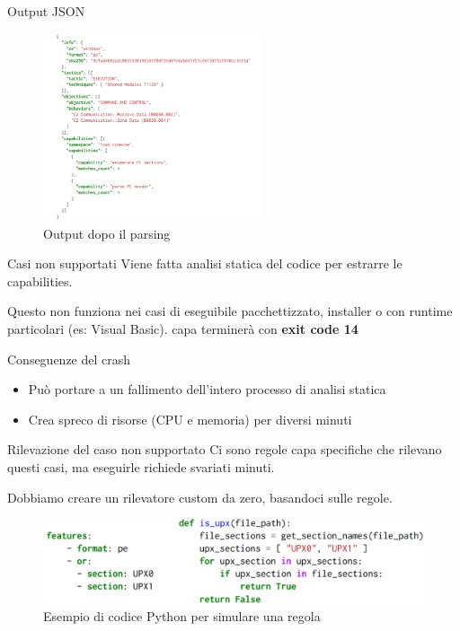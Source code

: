 \begin{frame}{Output JSON}
\begin{figure}
    \centering
    \includegraphics[width=0.57\textwidth]{images/capa_json_output.png}
    \caption{Output dopo il parsing}
    \label{fig:capa_json_output}
\end{figure}
\end{frame}

\begin{frame}{Casi non supportati}
Viene fatta analisi statica del codice per estrarre le capabilities.

Questo non funziona nei casi di eseguibile pacchettizzato, installer o con runtime particolari (es: Visual Basic).
\vfill
capa terminerà con \textbf{exit code 14}
\end{frame}

\begin{frame}{Conseguenze del crash}
\begin{itemize}
    \item Può portare a un fallimento dell'intero processo di analisi statica
    \item Crea spreco di risorse (CPU e memoria) per diversi minuti
\end{itemize}
\end{frame}

\begin{frame}{Rilevazione del caso non supportato}
Ci sono regole capa specifiche che rilevano questi casi, ma eseguirle richiede svariati minuti.

Dobbiamo creare un rilevatore custom da zero, basandoci sulle regole.

\begin{figure}
    \centering
    \includegraphics[width=\textwidth]{images/capa_detector_rule.png}
    \caption{Esempio di codice Python per simulare una regola}
    \label{fig:capa_detector_rule}
\end{figure}
\end{frame}

